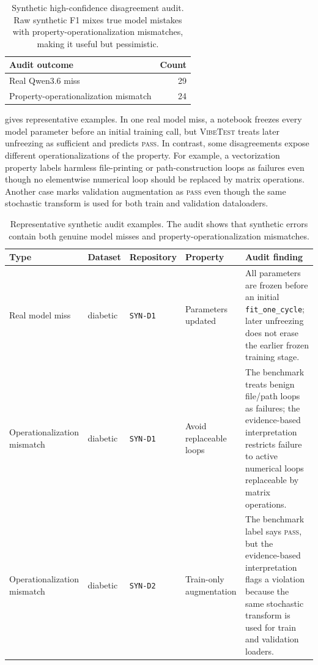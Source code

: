 \documentclass[11pt]{article}
\newcommand{\pass}{\textsc{pass}}
\newcommand{\vibetest}{\textsc{VibeTest}}
\newcommand{\qwen}{Qwen3.6}
\begin{document}
\begin{table}[t]
  \centering
  \small
  \begin{tabular}{lr}
    \toprule
    Audit outcome & Count \\
    \midrule
    Real \qwen{} miss & 29 \\
    Property-operationalization mismatch & 24 \\
    \bottomrule
  \end{tabular}
  \caption{Synthetic high-confidence disagreement audit. Raw synthetic F1 mixes true model mistakes with property-operationalization mismatches, making it useful but pessimistic.}
  \label{tab:synthetic-audit}
\end{table}

 gives representative examples.
In one real model miss, a notebook freezes every model parameter before an initial training call, but \vibetest{} treats later unfreezing as sufficient and predicts \pass.
In contrast, some disagreements expose different operationalizations of the property.
For example, a vectorization property labels harmless file-printing or path-construction loops as failures even though no elementwise numerical loop should be replaced by matrix operations.
Another case marks validation augmentation as \pass{} even though the same stochastic transform is used for both train and validation dataloaders.

\begin{table}[t]
  \centering
  \small
  \begin{tabular}{llllp{6.2cm}}
    \toprule
    Type & Dataset & Repository & Property & Audit finding \\
    \midrule
    Real model miss & diabetic & \texttt{SYN-D1} & Parameters updated & All parameters are frozen before an initial \texttt{fit\_one\_cycle}; later unfreezing does not erase the earlier frozen training stage. \\
    Operationalization mismatch & diabetic & \texttt{SYN-D1} & Avoid replaceable loops & The benchmark treats benign file/path loops as failures; the evidence-based interpretation restricts failure to active numerical loops replaceable by matrix operations. \\
    Operationalization mismatch & diabetic & \texttt{SYN-D2} & Train-only augmentation & The benchmark label says \pass, but the evidence-based interpretation flags a violation because the same stochastic transform is used for train and validation loaders. \\
    \bottomrule
  \end{tabular}
  \caption{Representative synthetic audit examples. The audit shows that synthetic errors contain both genuine model misses and property-operationalization mismatches.}
  \label{tab:synthetic-examples}
\end{table}
\end{document}
